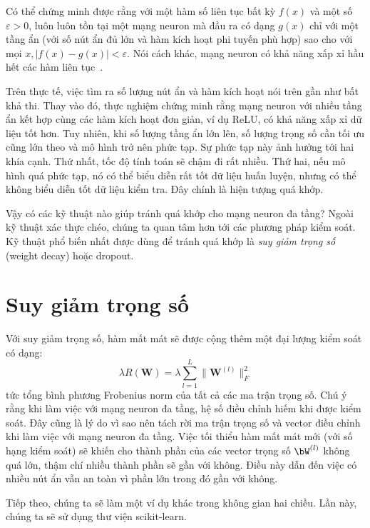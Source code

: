 Có thể chứng minh được rằng với một hàm số liên tục bất kỳ $f(x)$ và một
số $\varepsilon >0$, luôn luôn tồn tại một mạng neuron mà đầu ra có dạng
$g(x)$ chỉ với một tầng ẩn (với số nút ẩn đủ lớn và hàm kích hoạt phi
tuyến phù hợp) sao cho với mọi $x, |f(x) - g(x)| < \varepsilon$. Nói cách
khác, mạng neuron có khả năng xấp xỉ hầu hết các hàm liên tục~\cite{cybenko1989approximation}.
 
Trên thực tế, việc tìm ra số lượng nút ẩn và hàm kích hoạt nói trên gần như bất
khả thi. Thay vào đó, thực nghiệm chứng minh rằng mạng neuron với nhiều tầng ẩn
kết hợp cùng các hàm kích hoạt đơn giản, ví dụ ReLU, có khả năng xấp xỉ dữ liệu
tốt hơn. Tuy nhiên, khi số lượng tầng ẩn lớn lên, số lượng trọng số cần tối ưu
cũng lớn theo và mô hình trở nên phức tạp. Sự phức tạp này ảnh hưởng tới hai
khía cạnh. Thứ nhất, tốc độ tính toán sẽ chậm đi rất nhiều. Thứ hai, nếu mô hình
quá phức tạp, nó có thể biểu diễn rất tốt dữ liệu huấn luyện, nhưng có thể không
biểu diễn tốt dữ liệu kiểm tra. Đây chính là hiện tượng quá khớp.

Vậy có các kỹ thuật nào giúp tránh quá khớp cho mạng neuron đa tầng?
Ngoài kỹ thuật xác thực chéo, chúng ta quan tâm hơn tới các phương pháp
kiểm soát. Kỹ thuật phổ biến nhất được dùng để
tránh quá khớp là \textit{suy giảm trọng số} (weight decay) hoặc dropout. 

\section{Suy giảm trọng số}
Với suy giảm trọng số, hàm mất mát sẽ được cộng thêm một đại lượng kiểm soát có
dạng:
\begin{equation*} 
\lambda R(\mathbf{W}) = \lambda \sum_{l=1}^L \|\mathbf{W}^{(l)}\|_F^2 
\end{equation*} 
tức tổng bình phương Frobenius norm của tất cả các ma trận trọng số. Chú ý rằng khi
làm việc với mạng neuron đa tầng, hệ số điều chỉnh hiếm khi được kiểm soát. Đây cũng là lý
do vì sao nên tách rời ma trận trọng số và vector điều chỉnh khi làm việc với mạng neuron
đa tầng. Việc tối thiểu hàm mất mát mới (với số hạng kiểm soát) sẽ khiến cho
thành phần của các vector trọng số $\bW^{(l)}$ không quá lớn, thậm chí nhiều thành
phần sẽ gần với không. Điều này dẫn đến việc có nhiều nút ẩn vẫn an toàn vì phần
lớn trong đó gần với không.

Tiếp theo, chúng ta sẽ làm một ví dụ khác trong không gian hai chiều. Lần này,
chúng ta sẽ sử dụng thư viện scikit-learn.




